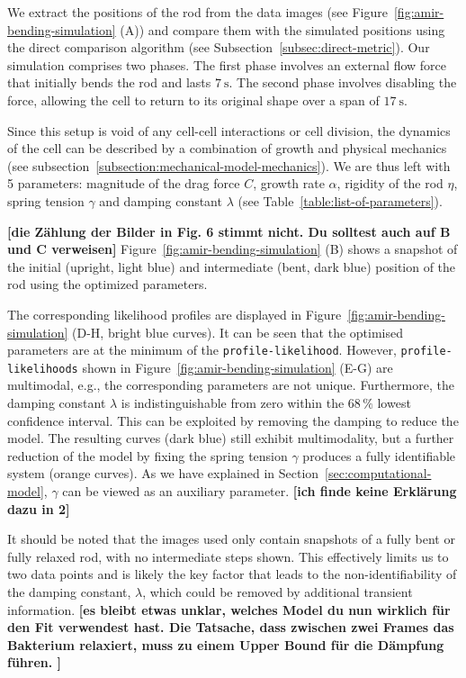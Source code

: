 \documentclass[10pt,letterpaper]{article}
\begin{document}
We extract the positions of the rod from the data images (see
Figure~\ref{fig:amir-bending-simulation} (A)) and compare them with the simulated positions using
the direct comparison algorithm (see Subsection~\ref{subsec:direct-metric}).
Our simulation comprises two phases.
The first phase involves an external flow force that initially bends the rod and lasts
$\SI{7}{\second}$.
The second phase involves disabling the force, allowing the cell to return to its original shape
over a span of $\SI{17}{\second}$.

Since this setup is void of any cell-cell interactions or cell division, the dynamics of the cell
can be described by a combination of growth and physical mechanics (see
subsection~\ref{subsection:mechanical-model-mechanics}).
We are thus left with 5 parameters: magnitude of the drag force $C$, growth rate $\alpha$, rigidity
of the rod $\eta$, spring tension $\gamma$ and damping constant $\lambda$ (see
Table~\ref{table:list-of-parameters}).

{\bf [die Zählung der Bilder in Fig. 6 stimmt nicht. Du solltest auch auf B und C verweisen]}
Figure~\ref{fig:amir-bending-simulation} (B) shows a snapshot of the initial (upright, light blue)
and intermediate (bent, dark blue) position of the rod using the optimized parameters.

The corresponding likelihood profiles are displayed in Figure~\ref{fig:amir-bending-simulation}
(D-H, bright blue curves). It can be seen that the optimised parameters are at the minimum of the
\texttt{profile-likelihood}. However, \texttt{profile-likelihoods} shown in
Figure~\ref{fig:amir-bending-simulation} (E-G) are multimodal, e.g., the corresponding parameters
are not unique.
Furthermore, the damping constant $\lambda$ is indistinguishable from zero within the $68\,\%$
lowest confidence interval.
This can be exploited by removing the damping to reduce the model.
The resulting curves (dark blue) still exhibit multimodality, but a further reduction of the model
by fixing the spring tension $\gamma$ produces a fully identifiable system (orange curves).
As we have explained in Section~\ref{sec:computational-model}, $\gamma$ can be viewed as an
auxiliary parameter.
{\bf [ich finde keine Erklärung dazu in 2]}

It should be noted that the images used only contain snapshots of a fully bent or fully relaxed rod,
with no intermediate steps shown.
This effectively limits us to two data points and is likely the key factor that leads to the
non-identifiability of the damping constant, $\lambda$, which could be removed by additional
transient information.
{\bf [es bleibt etwas unklar, welches Model du nun wirklich für den Fit verwendest hast. Die Tatsache, dass zwischen zwei Frames das Bakterium relaxiert, muss zu einem Upper Bound für die Dämpfung führen. ]}
\end{document}
